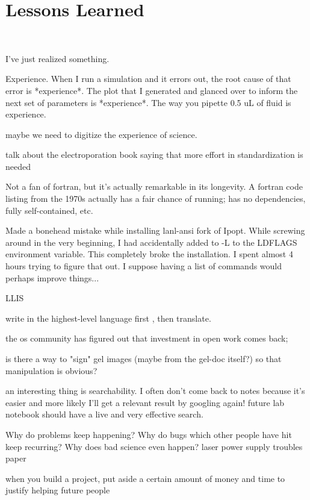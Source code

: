 \documentclass[paper.tex]{subfiles}
\begin{document}
\section{Lessons Learned} \

I've just realized something.

Experience. When I run a simulation and it errors out, the root cause of that error is *experience*. The plot that I generated and glanced over to inform the next set of parameters is *experience*. The way you pipette 0.5 uL of fluid is experience. 

maybe we need to digitize the experience of science. 





talk about the electroporation book saying that more effort in standardization is needed




Not a fan of fortran, but it's actually remarkable in its longevity. A fortran code listing from the 1970s actually has a fair chance of running; has no dependencies, fully self-contained, etc.

Made a bonehead mistake while installing lanl-ansi fork of Ipopt. While screwing around in the very beginning, I had accidentally added to -L to the LDFLAGS environment variable. This completely broke the installation. I spent almost 4 hours trying to figure that out. I suppose having a list of commands would perhaps improve things...


LLIS

write in the highest-level language first , then translate. 


the os community has figured out that investment in open work comes back; 

is there a way to "sign" gel images (maybe from the gel-doc itself?) so that manipulation is obvious?


an interesting thing is searchability. I often don't come back to notes because it's easier and more likely I'll get a relevant result by googling again! future lab notebook should have a live and very effective search.

Why do problems keep happening? Why do bugs which other people have hit keep recurring? Why does bad science even happen?
laser power supply troubles paper 


when you build a project, put aside a certain amount of money and time to justify helping future people 
\end{document}
